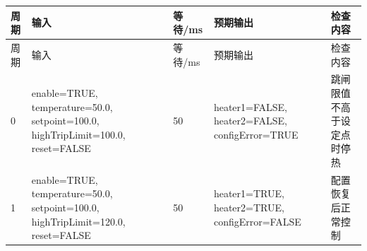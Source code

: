 \begin{longtable}{L{1.0cm}L{4.7cm}L{1.4cm}L{4.0cm}L{2.1cm}}

\toprule

周期 & 输入 & 等待/ms & 预期输出 & 检查内容\\

\midrule

\endfirsthead

\toprule

周期 & 输入 & 等待/ms & 预期输出 & 检查内容\\

\midrule

\endhead

0 & enable=TRUE, temperature=50.0, setpoint=100.0, highTripLimit=100.0, reset=FALSE & 50 & heater1=FALSE, heater2=FALSE, configError=TRUE & 跳闸限值不高于设定点时停热\\

1 & enable=TRUE, temperature=50.0, setpoint=100.0, highTripLimit=120.0, reset=FALSE & 50 & heater1=TRUE, heater2=TRUE, configError=FALSE & 配置恢复后正常控制\\

\bottomrule

\end{longtable}

\endgroup

